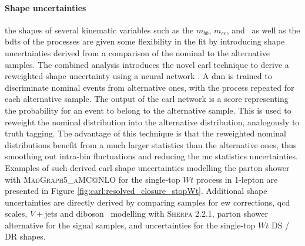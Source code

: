 \paragraph{Shape uncertainties} the shapes of several kinematic variables such as the $m_{bb}$, $m_{cc}$, and \ptv\ as well as the \glspl{bdt} of the processes are given some flexibility in the fit by introducing shape uncertainties derived from a comparison of the nominal to the alternative samples. The combined analysis introduces the novel \gls{carl} technique to derive a reweighted shape uncertainty using a neural network \cite{carl}. A \gls{dnn} is trained to discriminate nominal events from alternative ones, with the process repeated for each alternative sample. The output of the \gls{carl} network is a score representing the probability for an event to belong to the alternative sample. This is used to reweight the nominal distribution into the alternative distribution, analogously to truth tagging. The advantage of this technique is that the reweighted nominal distributions benefit from a much larger statistics than the alternative ones, thus smoothing out intra-bin fluctuations and reducing the \gls{mc} statistics uncertainties. Examples of such derived \gls{carl} shape uncertainties modelling the parton shower with \textsc{MadGraph5\_aMC@NLO} for the single-top $Wt$ process in 1-lepton are presented in Figure \ref{fig:carl:resolved_closure_stopWt}. Additional shape uncertainties are directly derived by comparing samples for \gls{ew} corrections, \gls{qcd} scales, $V+$jets and diboson \ptv\ modelling with \textsc{Sherpa} 2.2.1, parton shower alternative for the signal samples, and uncertainties for the single-top $Wt$ DS / DR shapes.

